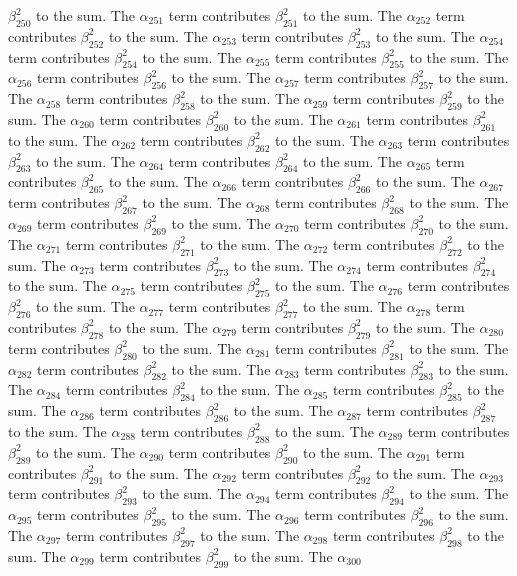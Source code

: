 \begin{lemma}
$\beta_{250}^{2}$ to the sum. The $\alpha_{251}$ term contributes $\beta_{251}^{2}$ to the sum. The $\alpha_{252}$ term contributes $\beta_{252}^{2}$ to the sum. The $\alpha_{253}$ term contributes $\beta_{253}^{2}$ to the sum. The $\alpha_{254}$ term contributes $\beta_{254}^{2}$ to the sum. The $\alpha_{255}$ term contributes $\beta_{255}^{2}$ to the sum. The $\alpha_{256}$ term contributes $\beta_{256}^{2}$ to the sum. The $\alpha_{257}$ term contributes $\beta_{257}^{2}$ to the sum. The $\alpha_{258}$ term contributes $\beta_{258}^{2}$ to the sum. The $\alpha_{259}$ term contributes $\beta_{259}^{2}$ to the sum. The $\alpha_{260}$ term contributes $\beta_{260}^{2}$ to the sum. The $\alpha_{261}$ term contributes $\beta_{261}^{2}$ to the sum. The $\alpha_{262}$ term contributes $\beta_{262}^{2}$ to the sum. The $\alpha_{263}$ term contributes $\beta_{263}^{2}$ to the sum. The $\alpha_{264}$ term contributes $\beta_{264}^{2}$ to the sum. The $\alpha_{265}$ term contributes $\beta_{265}^{2}$ to the sum. The $\alpha_{266}$ term contributes $\beta_{266}^{2}$ to the sum. The $\alpha_{267}$ term contributes $\beta_{267}^{2}$ to the sum. The $\alpha_{268}$ term contributes $\beta_{268}^{2}$ to the sum. The $\alpha_{269}$ term contributes $\beta_{269}^{2}$ to the sum. The $\alpha_{270}$ term contributes $\beta_{270}^{2}$ to the sum. The $\alpha_{271}$ term contributes $\beta_{271}^{2}$ to the sum. The $\alpha_{272}$ term contributes $\beta_{272}^{2}$ to the sum. The $\alpha_{273}$ term contributes $\beta_{273}^{2}$ to the sum. The $\alpha_{274}$ term contributes $\beta_{274}^{2}$ to the sum. The $\alpha_{275}$ term contributes $\beta_{275}^{2}$ to the sum. The $\alpha_{276}$ term contributes $\beta_{276}^{2}$ to the sum. The $\alpha_{277}$ term contributes $\beta_{277}^{2}$ to the sum. The $\alpha_{278}$ term contributes $\beta_{278}^{2}$ to the sum. The $\alpha_{279}$ term contributes $\beta_{279}^{2}$ to the sum. The $\alpha_{280}$ term contributes $\beta_{280}^{2}$ to the sum. The $\alpha_{281}$ term contributes $\beta_{281}^{2}$ to the sum. The $\alpha_{282}$ term contributes $\beta_{282}^{2}$ to the sum. The $\alpha_{283}$ term contributes $\beta_{283}^{2}$ to the sum. The $\alpha_{284}$ term contributes $\beta_{284}^{2}$ to the sum. The $\alpha_{285}$ term contributes $\beta_{285}^{2}$ to the sum. The $\alpha_{286}$ term contributes $\beta_{286}^{2}$ to the sum. The $\alpha_{287}$ term contributes $\beta_{287}^{2}$ to the sum. The $\alpha_{288}$ term contributes $\beta_{288}^{2}$ to the sum. The $\alpha_{289}$ term contributes $\beta_{289}^{2}$ to the sum. The $\alpha_{290}$ term contributes $\beta_{290}^{2}$ to the sum. The $\alpha_{291}$ term contributes $\beta_{291}^{2}$ to the sum. The $\alpha_{292}$ term contributes $\beta_{292}^{2}$ to the sum. The $\alpha_{293}$ term contributes $\beta_{293}^{2}$ to the sum. The $\alpha_{294}$ term contributes $\beta_{294}^{2}$ to the sum. The $\alpha_{295}$ term contributes $\beta_{295}^{2}$ to the sum. The $\alpha_{296}$ term contributes $\beta_{296}^{2}$ to the sum. The $\alpha_{297}$ term contributes $\beta_{297}^{2}$ to the sum. The $\alpha_{298}$ term contributes $\beta_{298}^{2}$ to the sum. The $\alpha_{299}$ term contributes $\beta_{299}^{2}$ to the sum. The $\alpha_{300}$ 
\end{lemma}
